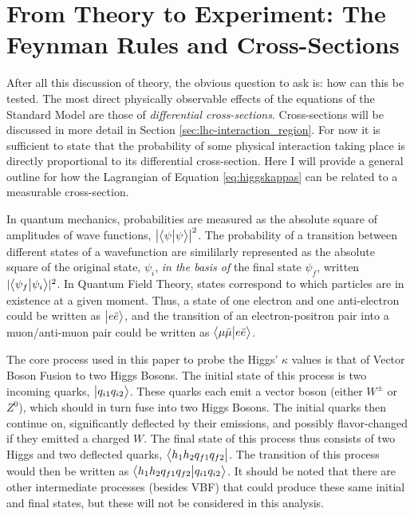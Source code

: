\section{From Theory to Experiment: The Feynman Rules and Cross-Sections}
    
    After all this discussion of theory, the obvious question to ask is: how can this be tested.
    The most direct physically observable effects of the equations of the Standard Model are those of \textit{differential cross-sections}.
    Cross-sections will be discussed in more detail in Section \ref{sec:lhc-interaction_region}.
    For now it is sufficient to state that the probability of some physical interaction taking place
        is directly proportional to its differential cross-section.
    Here I will provide a general outline for how the Lagrangian of Equation \ref{eq:higgskappas} can be related to a measurable cross-section.

    In quantum mechanics, probabilities are measured as the absolute square of amplitudes of wave functions, $\left|\big< \psi \big| \psi \big>\right|^2$.
    The probability of a transition between different states of a wavefunction are simililarly represented
        as the absolute square of the original state, $\psi_i$, \textit{in the basis of} the final state $\psi_f$,
        written $ |\big< \psi_f \big| \psi_i \big>|^2$.
    In Quantum Field Theory, states correspond to which particles are in existence at a given moment.
    Thus, a state of one electron and one anti-electron could be written as $\big| e \bar{e} \big>$,
        and the transition of an electron-positron pair into a muon/anti-muon pair could be written
        as $\big< \mu \bar{\mu} \big| e \bar{e} \big>$.

    The core process used in this paper to probe the Higgs' $\kappa$ values is that of Vector Boson Fusion to two Higgs Bosons.
    The initial state of this process is two incoming quarks, $\big| q_{i1} q_{i2} \big>$.
    These quarks each emit a vector boson (either $W^{\pm}$ or $Z^0$), 
    which should in turn fuse into two Higgs Bosons.
    The initial quarks then continue on, significantly deflected by their emissions, and possibly flavor-changed if they emitted a charged $W$.
    The final state of this process thus consists of two Higgs and two deflected quarks, $\big< h_1 h_2 q_{f1} q_{f2} \big|$.
    The transition of this process would then be written as $\big<  h_1 h_2 q_{f1} q_{f2} \big| q_{i1} q_{i2} \big>$.
    It should be noted that there are other intermediate processes (besides VBF)
        that could produce these same initial and final states, but these will not be considered in this analysis.

